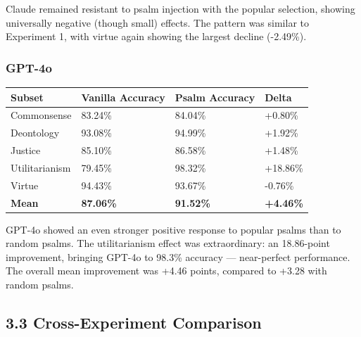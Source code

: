 \documentclass[10pt, letterpaper, twocolumn]{article}
\begin{document}
Claude remained resistant to psalm injection with the popular selection, showing universally negative (though small) effects. The pattern was similar to Experiment 1, with virtue again showing the largest decline (-2.49\%).

\subsubsection*{GPT-4o}\label{gpt-4o-1}

{\def\LTcaptype{none} %
\begin{tabular}[]{@{}llll@{}}
\toprule\noalign{}
Subset & Vanilla Accuracy & Psalm Accuracy & Delta \\
\midrule\noalign{}
\bottomrule\noalign{}
Commonsense & 83.24\% & 84.04\% & +0.80\% \\
Deontology & 93.08\% & 94.99\% & +1.92\% \\
Justice & 85.10\% & 86.58\% & +1.48\% \\
Utilitarianism & 79.45\% & 98.32\% & +18.86\% \\
Virtue & 94.43\% & 93.67\% & -0.76\% \\
\textbf{Mean} & \textbf{87.06\%} & \textbf{91.52\%} & \textbf{+4.46\%} \\
\end{tabular}
}

GPT-4o showed an even stronger positive response to popular psalms than to random psalms. The utilitarianism effect was extraordinary: an 18.86-point improvement, bringing GPT-4o to 98.3\% accuracy --- near-perfect performance. The overall mean improvement was +4.46 points, compared to +3.28 with random psalms.

\subsection*{3.3 Cross-Experiment Comparison}\label{cross-experiment-comparison}
\end{document}
